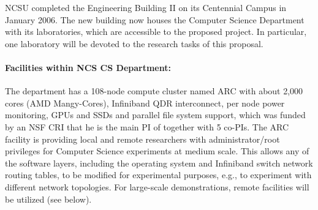 
%

\pagestyle{empty}
\setcounter{page}{1}
\setcounter{section}{0}
\setcounter{page}{1}
\setcounter{section}{0}

NCSU completed the Engineering Building II on its Centennial Campus in
January 2006. The new building now houses the Computer Science
Department with its laboratories, which are accessible to the proposed
project. In particular, one laboratory will be devoted to the research
tasks of this proposal.

\paragraph{Facilities within NCS CS Department:}
The department has a 108-node compute cluster named ARC with about
2,000 cores (AMD Mangy-Cores), Infiniband QDR interconnect, per node
power monitoring, GPUs and SSDs and parallel file system support,
which was funded by an NSF CRI that he is the main PI of together with
5 co-PIs. 
%
The ARC facility is providing local and remote researchers with
administrator/root privileges for Computer Science experiments at
medium scale. This allows any of the software layers, including the
operating system and Infiniband switch network routing tables, to be
modified for experimental purposes, e.g., to experiment with different
network topologies.  For large-scale demonstrations, remote 
facilities will be utilized (see below).



